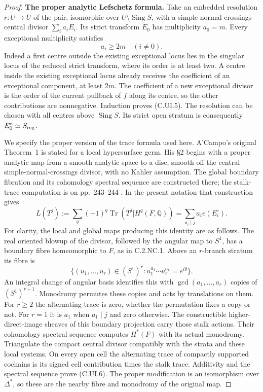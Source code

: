 \begin{proof}
\par\medskip\noindent\textbf{The proper analytic Lefschetz formula.}\quad
Take an embedded resolution
$r:\widetilde U\to U$ of the pair, isomorphic over
$U\setminus\operatorname{Sing}S$, with a simple
normal-crossings central divisor
$\sum_i a_iE_i$. Its strict transform $E_0$ has
multiplicity $a_0=m$. Every exceptional multiplicity
satisfies
\[
                    a_i\ge2m\quad(i\ne0).
 \tag{C.UI.5}
\]
Indeed a first centre outside the existing exceptional
locus lies in the singular locus of the reduced strict
transform, where its order is at least two. A centre
inside the existing exceptional locus already receives
the coefficient of an exceptional component, at least
$2m$. The coefficient of a new exceptional divisor is
the order of the current pullback of $f$ along its centre,
so the other contributions are nonnegative. Induction
proves (C.UI.5). The resolution can be chosen with all
centres above $\operatorname{Sing}S$. Its strict open
stratum is consequently
$E_0^\circ\simeq S_{\rm reg}$.

We specify the proper version of the trace formula used
here. A'Campo's original Theorem~1 is stated for a local
hypersurface germ. His \S2 begins with a proper analytic
map from a smooth analytic space to a disc, smooth off
the central simple-normal-crossings divisor, with no
Kahler assumption. The global boundary fibration and
its cohomology spectral sequence are constructed there;
the stalk-trace computation is on pp.~243--244
\cite[\S2 and \S3]{ACampo1975}. In the present notation
that construction gives
\[
 L(T^j):=\sum_q(-1)^q\operatorname{Tr}
       (T^j|H^q(F,\mathbb Q))
       =\sum_{a_i\mid j}a_i e(E_i^\circ).
 \tag{C.UI.6}
\]
For clarity, the local and global maps producing this
identity are as follows. The real oriented blowup of
the divisor, followed by the angular map to $S^1$,
has a boundary fibre homeomorphic to $F$, as in
C.2.NC.1. Above an $r$-branch stratum its fibre is
\[
 \{(u_1,\ldots,u_r)\in(S^1)^r:
                 u_1^{a_1}\cdots u_r^{a_r}=e^{i\theta}\}.
 \tag{C.UI.7}
\]
An integral change of angular basis identifies this with
$\gcd(a_1,\ldots,a_r)$ copies of $(S^1)^{r-1}$.
Monodromy permutes these copies and acts by translations
on them. For $r\ge2$ the alternating trace is zero,
whether the permutation fixes a copy or not. For $r=1$
it is $a_1$ when $a_1\mid j$ and zero otherwise.
The constructible higher-direct-image sheaves of this
boundary projection carry those stalk actions. Their
cohomology spectral sequence computes $H^*(F)$ with
its actual monodromy. Triangulate the compact central
divisor compatibly with the strata and these local
systems. On every open cell the alternating trace of
compactly supported cochains is its signed cell
contribution times the stalk trace. Additivity and
the spectral sequence prove (C.UI.6). The proper
modification is an isomorphism over $\Delta^*$, so
these are the nearby fibre and monodromy of the
original map.


\end{proof}
